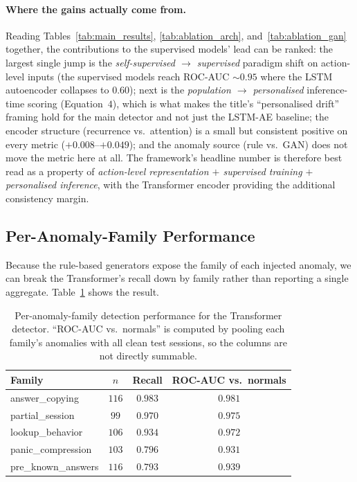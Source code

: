 \documentclass[sigconf]{acmart}
\begin{document}
\paragraph{Where the gains actually come from.} Reading Tables~\ref{tab:main_results}, \ref{tab:ablation_arch}, and~\ref{tab:ablation_gan} together, the contributions to the supervised models' lead can be ranked: the largest single jump is the \emph{self-supervised $\to$ supervised} paradigm shift on action-level inputs (the supervised models reach ROC-AUC $\sim 0.95$ where the LSTM autoencoder collapses to $0.60$); next is the \emph{population $\to$ personalised} inference-time scoring (Equation~$4$), which is what makes the title's ``personalised drift'' framing hold for the main detector and not just the LSTM-AE baseline; the encoder structure (recurrence vs.\ attention) is a small but consistent positive on every metric ($+0.008$--$+0.049$); and the anomaly source (rule vs.\ GAN) does not move the metric here at all. The framework's headline number is therefore best read as a property of \emph{action-level representation $+$ supervised training $+$ personalised inference}, with the Transformer encoder providing the additional consistency margin.

\subsection{Per-Anomaly-Family Performance}
\label{sec:per_family}
Because the rule-based generators expose the family of each injected anomaly, we can break the Transformer's recall down by family rather than reporting a single aggregate. Table~\ref{tab:per_family} shows the result.

\begin{table}[htbp]
\caption{Per-anomaly-family detection performance for the Transformer detector. ``ROC-AUC vs.\ normals'' is computed by pooling each family's anomalies with all clean test sessions, so the columns are not directly summable.}
\label{tab:per_family}
\centering
\small
\begin{tabular}{lccc}
\toprule
\textbf{Family} & \textbf{$n$} & \textbf{Recall} & \textbf{ROC-AUC vs.\ normals} \\
\midrule
answer\_copying                 & $116$ & $0.983$ & $0.981$ \\
partial\_session                & $99$  & $0.970$ & $0.975$ \\
lookup\_behavior                & $106$ & $0.934$ & $0.972$ \\
panic\_compression              & $103$ & $0.796$ & $0.931$ \\
pre\_known\_answers             & $116$ & $0.793$ & $0.939$ \\
\bottomrule
\end{tabular}
\end{table}
\end{document}
